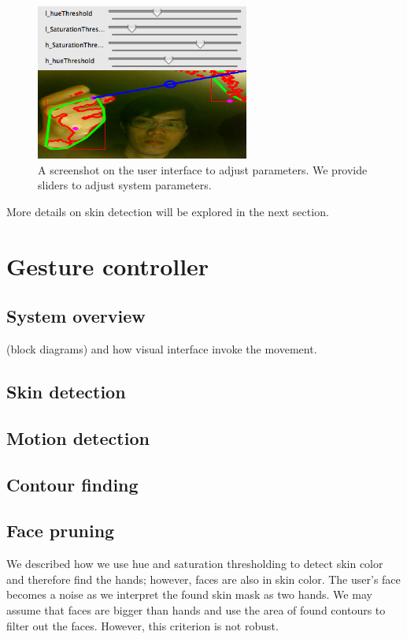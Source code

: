 \documentclass[10pt,twocolumn,letterpaper]{article}
\begin{document}
\begin{figure}[h]
\centering
\includegraphics[width=7cm]{adjustui.png}
\caption{A screenshot on the user interface to adjust parameters. We provide 
sliders to adjust system parameters.}
\label{fig:adjusting}
\end{figure}

More details on skin detection will be explored in the next section.

\section{Gesture controller}
\subsection{System overview}
(block diagrams) and how visual interface invoke the movement.

\subsection{Skin detection}

\subsection{Motion detection}

\subsection{Contour finding}
\label{sec:contour}

\subsection{Face pruning}
\label{sec:face}
We described how we use hue and saturation thresholding to detect skin
 color and therefore find the hands; however, faces are also in skin color. 
 The user's face becomes a noise as we interpret the found skin mask as 
 two hands. We may assume that faces are bigger than hands and use 
 the area of found contours to filter out the faces. However, this criterion is not robust. 
\end{document}
